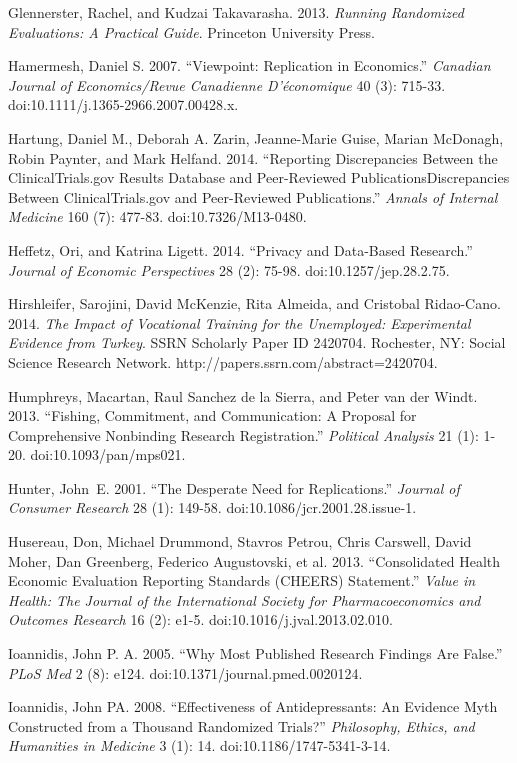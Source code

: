 \documentclass[12pt] {article}
\begin{document}
Glennerster, Rachel, and Kudzai Takavarasha. 2013. \emph{Running
Randomized Evaluations: A Practical Guide}. Princeton University Press.

Hamermesh, Daniel S. 2007. ``Viewpoint: Replication in Economics.''
\emph{Canadian Journal of Economics/Revue Canadienne D'économique} 40
(3): 715-33. doi:10.1111/j.1365-2966.2007.00428.x.

Hartung, Daniel M., Deborah A. Zarin, Jeanne-Marie Guise, Marian
McDonagh, Robin Paynter, and Mark Helfand. 2014. ``Reporting
Discrepancies Between the ClinicalTrials.gov Results Database and
Peer-Reviewed PublicationsDiscrepancies Between ClinicalTrials.gov and
Peer-Reviewed Publications.'' \emph{Annals of Internal Medicine} 160
(7): 477-83. doi:10.7326/M13-0480.

Heffetz, Ori, and Katrina Ligett. 2014. ``Privacy and Data-Based
Research.'' \emph{Journal of Economic Perspectives} 28 (2): 75-98.
doi:10.1257/jep.28.2.75.

Hirshleifer, Sarojini, David McKenzie, Rita Almeida, and Cristobal
Ridao-Cano. 2014. \emph{The Impact of Vocational Training for the
Unemployed: Experimental Evidence from Turkey}. SSRN Scholarly Paper ID
2420704. Rochester, NY: Social Science Research Network.
http://papers.ssrn.com/abstract=2420704.

Humphreys, Macartan, Raul Sanchez de la Sierra, and Peter van der Windt.
2013. ``Fishing, Commitment, and Communication: A Proposal for
Comprehensive Nonbinding Research Registration.'' \emph{Political
Analysis} 21 (1): 1-20. doi:10.1093/pan/mps021.

Hunter, John~E. 2001. ``The Desperate Need for Replications.''
\emph{Journal of Consumer Research} 28 (1): 149-58.
doi:10.1086/jcr.2001.28.issue-1.

Husereau, Don, Michael Drummond, Stavros Petrou, Chris Carswell, David
Moher, Dan Greenberg, Federico Augustovski, et al. 2013. ``Consolidated
Health Economic Evaluation Reporting Standards (CHEERS) Statement.''
\emph{Value in Health: The Journal of the International Society for
Pharmacoeconomics and Outcomes Research} 16 (2): e1-5.
doi:10.1016/j.jval.2013.02.010.

Ioannidis, John P. A. 2005. ``Why Most Published Research Findings Are
False.'' \emph{PLoS Med} 2 (8): e124. doi:10.1371/journal.pmed.0020124.

Ioannidis, John PA. 2008. ``Effectiveness of Antidepressants: An
Evidence Myth Constructed from a Thousand Randomized Trials?''
\emph{Philosophy, Ethics, and Humanities in Medicine} 3 (1): 14.
doi:10.1186/1747-5341-3-14.
\end{document}

